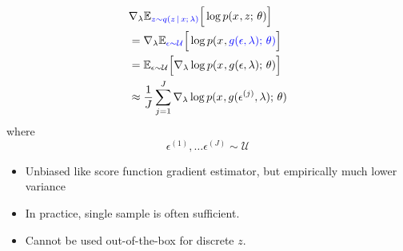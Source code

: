 
\begin{frame}
\begin{align*}
    & \nabla_\lambda \mathbb{E}_{{\color{blue} z\sim q(z\,|\, x ; \, \lambda)}}\Big[ \log p(x^{}, z ; \, \theta )\Big] \\
    &= \nabla_\lambda \mathbb{E}_{{\color{blue} \epsilon \sim \mathcal{U}}}\Big[ \log p(x^{}, {\color{blue} g(\epsilon,\lambda) ; \, \theta) }\Big] \\
    &=  \mathbb{E}_{{ \epsilon \sim \mathcal{U}}}\Big[\nabla_\lambda \log {p(x^{}, { g(\epsilon,\lambda)} ; \,\theta) }\Big] \\
    &\approx \frac{1}{J} \sum_{j=1}^J\nabla_\lambda \log {p(x^{}, { g(\epsilon^{(j)},\lambda)} ; \,\theta) }
\end{align*}
where
\[ \epsilon^{(1)}, \dots \epsilon^{(J)} \sim \mathcal{U}\]
\end{frame}


\begin{frame}
\center
\begin{itemize}
    \item Unbiased like score function gradient estimator, but empirically much lower variance
    \item In practice, single sample is often sufficient.
    \item Cannot be used out-of-the-box for discrete $z$.
\end{itemize}
\end{frame}


